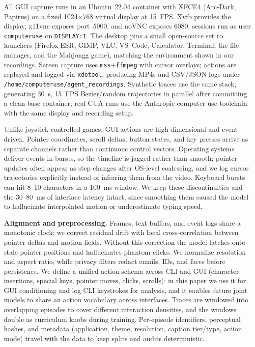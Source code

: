 All GUI capture runs in an Ubuntu~22.04 container with XFCE4 (Arc-Dark, Papirus) on a fixed 1024$\times$768 virtual display at 15~FPS. Xvfb provides the display, x11vnc exposes port~5900, and noVNC exposes 6080; sessions run as user \texttt{computeruse} on \texttt{DISPLAY{:}1}. The desktop pins a small open-source set to launchers (Firefox ESR, GIMP, VLC, VS~Code, Calculator, Terminal, the file manager, and the Mahjongg game), matching the environment shown in our recordings. Screen capture uses \texttt{mss}+\texttt{ffmpeg} with cursor overlays; actions are replayed and logged via \texttt{xdotool}, producing MP4s and CSV/JSON logs under \texttt{/home/computeruse/agent\_recordings}. Synthetic traces use the same stack, generating 30~s, 15~FPS Bezier/random trajectories in parallel after committing a clean base container; real CUA runs use the Anthropic computer-use toolchain with the same display and recording setup.

Unlike joystick-controlled games, GUI actions are high-dimensional and event-driven. Pointer coordinates, scroll deltas, button states, and key presses arrive as separate channels rather than continuous control vectors. Operating systems deliver events in bursts, so the timeline is jagged rather than smooth; pointer updates often appear as step changes after OS-level coalescing, and we log cursor trajectories explicitly instead of inferring them from the video. Keyboard bursts can hit 8--10 characters in a 100~ms window. We keep these discontinuities and the 30--80~ms of interface latency intact, since smoothing them caused the model to hallucinate interpolated motion or underestimate typing speed.

\noindent\textbf{Alignment and preprocessing.}
Frames, text buffers, and event logs share a monotonic clock; we correct residual drift with local cross-correlation between pointer deltas and motion fields. Without this correction the model latches onto stale pointer positions and hallucinates phantom clicks. We normalize resolution and aspect ratio, while privacy filters redact emails, IDs, and faces before persistence. We define a unified action schema across CLI and GUI (character insertions, special keys, pointer moves, clicks, scrolls): in this paper we use it for GUI conditioning and log CLI keystrokes for analysis, and it enables future joint models to share an action vocabulary across interfaces. Traces are windowed into overlapping episodes to cover different interaction densities, and the windows double as curriculum knobs during training. Per-episode identifiers, perceptual hashes, and metadata (application, theme, resolution, caption tier/type, action mode) travel with the data to keep splits and audits deterministic.

